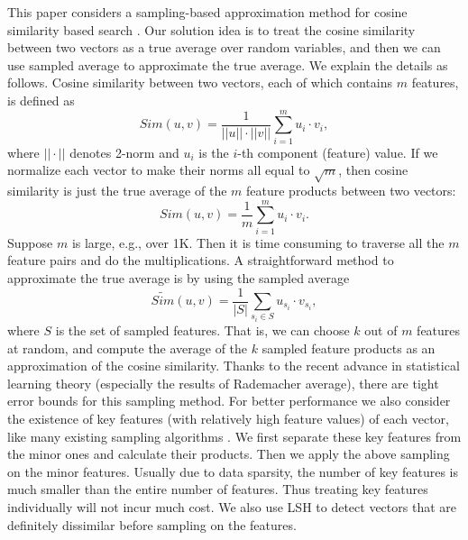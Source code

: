 \documentclass[sigconf,anonymous]{acmart}
\begin{document}
This paper considers a sampling-based approximation method for cosine similarity based search \cite{SGM00,Xia16,ATY13,TAJY14}. Our solution idea is to treat the cosine similarity between two vectors as a true average over random variables, and then we can use sampled average to approximate the true average. We explain the details as follows.
Cosine similarity between two vectors, each of which contains $m$ features, is defined as
$$Sim(u,v) = \frac{1}{||u||\cdot||v||} \sum_{i=1}^m u_i\cdot v_i,$$
where $||\cdot||$ denotes 2-norm and $u_i$ is the $i$-th component (feature) value. If we normalize each vector to make their norms all equal to $\sqrt{m}$, then cosine similarity is just the true average of the $m$ feature products between two vectors:
$$Sim(u,v) = \frac{1}{m} \sum_{i=1}^m u_i\cdot v_i.$$
Suppose $m$ is large, e.g., over 1K. Then it is time consuming to traverse all the $m$ feature pairs and do the multiplications. A straightforward method to approximate the true average is by using the sampled average
$$\widetilde{Sim}(u,v) = \frac{1}{|S|} \sum_{s_i\in S} u_{s_i}\cdot v_{s_i},$$
where $S$ is the set of sampled features. 
That is, we can choose $k$ out of $m$ features at random, and compute the average of the $k$ sampled feature products as an approximation of the cosine similarity.
Thanks to the recent advance in statistical learning theory (especially the results of Rademacher average), there are tight error bounds for this sampling method.
For better performance we also consider the existence of key features (with relatively high feature values) of each vector, like many existing sampling algorithms \cite{CL99,BKP15}. We first separate these key features from the minor ones and calculate their products. Then we apply the above sampling on the minor features. Usually due to data sparsity, the number of key features is much smaller than the entire number of features. Thus treating key features individually will not incur much cost. We also use LSH to detect vectors that are definitely dissimilar before sampling on the features.
\end{document}
